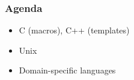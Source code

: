 \begin{frame}

\frametitle{Agenda}

\begin{itemize}

\item C (macros), C++ (templates)

\item Unix

\item Domain-specific languages

\end{itemize}

\end{frame}
